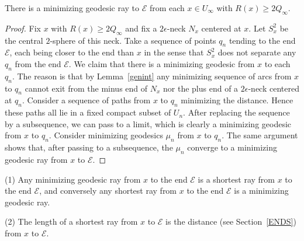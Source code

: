 \begin{claim}
\label{claim:minimizing-ray-to-end-exists}
There is a minimizing geodesic ray to ${\mathcal E}$ from each $x\in
U_\infty$ with $R(x)\ge 2Q_\infty$.
\end{claim}

\begin{proof}
Fix $x$ with $R(x)\ge 2Q_\infty$ and fix a $2\epsilon$-neck $N_x$
centered at $x$. Let $S_x^2$ be the central $2$-sphere of this neck.
Take a sequence of points $q_n$ tending to the end ${\mathcal E}$,
each being closer to the end than $x$ in the sense that $S^2_x$ does
not separate any $q_n$ from the end ${\mathcal E}$. We claim that
there is a minimizing geodesic from $x$ to each $q_n$. The reason is
that by Lemma~\ref{genint} any minimizing sequence of arcs from $x$
to $q_n$ cannot exit from the minus end of $N_x$ nor the plus end of
a $2\epsilon$-neck centered at $q_n$. Consider a sequence of paths
from $x$ to $q_n$ minimizing the distance.  Hence these paths all
lie in a fixed compact subset of $U_n$. After replacing the sequence
by a subsequence, we can pass to a limit, which is clearly a
minimizing geodesic from $x$ to $q_n$. Consider minimizing geodesics
$\mu_n$ from $x$ to $q_n$. The same argument shows that, after
passing to a subsequence, the $\mu_n$ converge to a minimizing
geodesic ray from $x$ to ${\mathcal E}$.
\end{proof}


\begin{claim}
\label{claim:shortest-ray-equivalence}
(1) Any minimizing geodesic ray from $x$ to the end ${\mathcal E}$
is a shortest ray from $x$ to the end ${\mathcal E}$, and conversely
any shortest ray from $x$ to the end ${\mathcal E}$ is a minimizing
geodesic ray.

(2) The length of a shortest ray from $x$ to ${\mathcal E}$ is the
distance (see Section~\ref{ENDS}) from $x$ to ${\mathcal E}$.
\end{claim}


